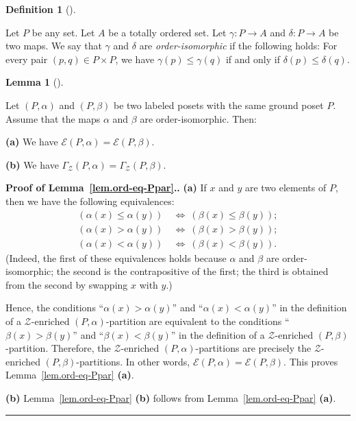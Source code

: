 \documentclass[numbers=enddot,12pt,final,onecolumn,notitlepage]{scrartcl}%
\theoremstyle{definition}
\newtheorem{lem}[theo]{Lemma}
\newenvironment{lemma}[1][]
{\begin{lem}[#1]\begin{leftbar}}
{\end{leftbar}\end{lem}}
\newtheorem{defi}[theo]{Definition}
\newenvironment{definition}[1][]
{\begin{defi}[#1]\begin{leftbar}}
{\end{leftbar}\end{defi}}
\newenvironment{proof}[1][Proof]{\noindent\textbf{#1.} }{\ \rule{0.5em}{0.5em}}
\begin{document}
\begin{definition}
Let $P$ be any set. Let $A$ be a totally ordered set. Let $\gamma:P\rightarrow
A$ and $\delta:P\rightarrow A$ be two maps. We say that $\gamma$ and $\delta$
are \textit{order-isomorphic} if the following holds: For every pair $\left(
p,q\right)  \in P\times P$, we have $\gamma\left(  p\right)  \leq\gamma\left(
q\right)  $ if and only if $\delta\left(  p\right)  \leq\delta\left(
q\right)  $.
\end{definition}

\begin{lemma} \label{lem.ord-eq-Ppar}
Let $\left(P, \alpha\right)$ and $\left(P, \beta\right)$ be two labeled posets
with the same ground poset $P$.
Assume that the maps $\alpha$ and $\beta$ are order-isomorphic. Then:

\textbf{(a)} We have
$\mathcal{E}\left(P, \alpha\right) = \mathcal{E}\left(P, \beta\right)$.

\textbf{(b)} We have
$\Gamma_{\mathcal{Z}}\left(P, \alpha\right) = \Gamma_{\mathcal{Z}}\left(P, \beta\right)$.
\end{lemma}

\begin{proof}[Proof of Lemma~\ref{lem.ord-eq-Ppar}.]
\textbf{(a)} If $x$ and $y$ are two elements of $P$, then we have the following
equivalences:
\begin{align*}
\left( \alpha\left(x\right) \leq \alpha\left(y\right) \right)
  \ &\Longleftrightarrow \ %
  \left( \beta\left(x\right) \leq \beta\left(y\right) \right) ; \\
\left( \alpha\left(x\right) > \alpha\left(y\right) \right)
  \ &\Longleftrightarrow \ %
  \left( \beta\left(x\right) > \beta\left(y\right) \right) ; \\
\left( \alpha\left(x\right) < \alpha\left(y\right) \right)
  \ &\Longleftrightarrow \ %
  \left( \beta\left(x\right) < \beta\left(y\right) \right) .
\end{align*}
(Indeed, the first of these equivalences holds because $\alpha$ and $\beta$
are order-isomorphic; the second is the contrapositive of the first; the
third is obtained from the second by swapping $x$ with $y$.)

Hence, the conditions ``$\alpha\left(x\right) > \alpha\left(y\right)$''
and ``$\alpha\left(x\right) < \alpha\left(y\right)$'' in the definition
of a $\mathcal{Z}$-enriched $\left(P, \alpha\right)$-partition are
equivalent to the conditions
``$\beta\left(x\right) > \beta\left(y\right)$''
and ``$\beta\left(x\right) < \beta\left(y\right)$'' in the definition
of a $\mathcal{Z}$-enriched $\left(P, \beta\right)$-partition.
Therefore, the $\mathcal{Z}$-enriched $\left(P, \alpha\right)$-partitions
are precisely the
$\mathcal{Z}$-enriched $\left(P, \beta\right)$-partitions.
In other words,
$\mathcal{E}\left(P, \alpha\right) = \mathcal{E}\left(P, \beta\right)$.
This proves Lemma~\ref{lem.ord-eq-Ppar} \textbf{(a)}.

\textbf{(b)} Lemma~\ref{lem.ord-eq-Ppar} \textbf{(b)} follows from
Lemma~\ref{lem.ord-eq-Ppar} \textbf{(a)}.
\end{proof}
\end{document}
